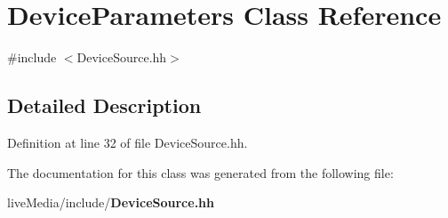 \section{Device\+Parameters Class Reference}
\label{classDeviceParameters}


{\ttfamily \#include $<$Device\+Source.\+hh$>$}



\subsection{Detailed Description}


Definition at line 32 of file Device\+Source.\+hh.



The documentation for this class was generated from the following file\+:\begin{DoxyCompactItemize}
\item 
live\+Media/include/{\bf Device\+Source.\+hh}\end{DoxyCompactItemize}

